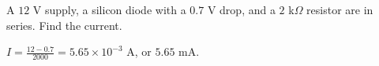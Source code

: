 \begin{Exercise}[title={A Larger Supply}, label=diode_current]
A $12$ V supply, a silicon diode with a $0.7$ V drop, and a $2$ k$\Omega$ resistor are in series. Find the current.
\end{Exercise}
\begin{Answer}[ref=diode_current]
$I = \frac{12 - 0.7}{2000} = 5.65 \times 10^{-3}$ A, or $5.65$ mA.
\end{Answer}
